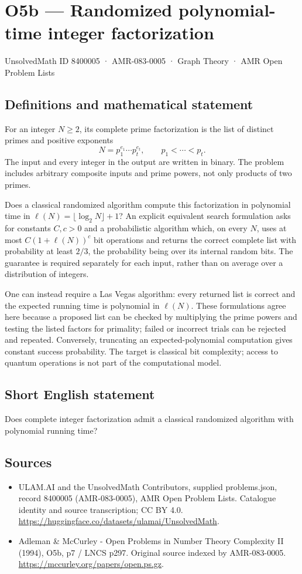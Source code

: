 \documentclass[11pt,a4paper]{article}
\begin{document}
\section*{O5b — Randomized polynomial-time integer factorization}\label{8400005}
{\small UnsolvedMath ID 8400005 · AMR-083-0005 · Graph Theory · AMR Open Problem Lists}
\subsection{Definitions and mathematical statement}
For an integer $N\ge2$, its complete prime factorization is the list of distinct primes and positive exponents
\[
N=p_1^{e_1}\cdots p_t^{e_t},\qquad p_1<\cdots<p_t.
\]
The input and every integer in the output are written in binary. The problem includes arbitrary composite inputs and prime powers, not only products of two primes.

Does a classical randomized algorithm compute this factorization in polynomial time in $\ell(N)=\lfloor\log_2N\rfloor+1$? An explicit equivalent search formulation asks for constants $C,c>0$ and a probabilistic algorithm which, on every $N$, uses at most $C(1+\ell(N))^c$ bit operations and returns the correct complete list with probability at least $2/3$, the probability being over its internal random bits. The guarantee is required separately for each input, rather than on average over a distribution of integers.

One can instead require a Las Vegas algorithm: every returned list is correct and the expected running time is polynomial in $\ell(N)$. These formulations agree here because a proposed list can be checked by multiplying the prime powers and testing the listed factors for primality; failed or incorrect trials can be rejected and repeated. Conversely, truncating an expected-polynomial computation gives constant success probability. The target is classical bit complexity; access to quantum operations is not part of the computational model.
\subsection{Short English statement}
Does complete integer factorization admit a classical randomized algorithm with polynomial running time?
\subsection{Sources}
\begin{itemize}
\item[S1] ULAM.AI and the UnsolvedMath Contributors, supplied problems.json, record 8400005 (AMR-083-0005), AMR Open Problem Lists. Catalogue identity and source transcription; CC BY 4.0.
\url{https://huggingface.co/datasets/ulamai/UnsolvedMath}.
\item[S2] Adleman \& McCurley - Open Problems in Number Theory Complexity II (1994), O5b, p7 / LNCS p297. Original source indexed by AMR-083-0005.
\url{https://mccurley.org/papers/open.ps.gz}.
\end{itemize}
\end{document}
